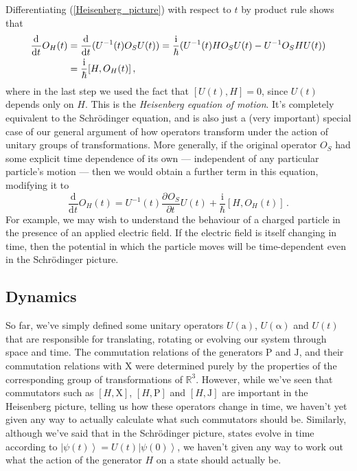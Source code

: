 \documentclass{article}
\theoremstyle{plain}\theoremheaderfont{\normalfont\itshape}\theorembodyfont{\rmfamily}\theoremseparator{.}\newtheorem*{rem}{Remark}\newtheorem*{ex}{Example}\newtheorem*{proof}{Proof}\newtheorem*{altp}{Alternative proof}
\theoremstyle{plain}\theoremheaderfont{\normalfont\bfseries}\theorembodyfont{\rmfamily}\theoremseparator{.}\newtheorem{thm}{Theorem}[section]\newtheorem{lem}[thm]{Lemma}\newtheorem{prop}[thm]{Proposition}\newtheorem*{cor}{Corollary}\newtheorem{defn}[thm]{Definition}\newtheorem{clm}[thm]{Claim}\newtheorem{clminproof}{Claim}
\theoremstyle{break}\theoremheaderfont{\normalfont\itshape}\theorembodyfont{\rmfamily}\theoremseparator{.\medskip}\newtheorem*{proofskip}{Proof}\newtheorem*{exs}{Examples}\newtheorem*{rems}{Remarks}
\theoremstyle{break}\theoremheaderfont{\normalfont\bfseries}\theorembodyfont{\rmfamily}\theoremseparator{.\medskip}\newtheorem{lemskip}[thm]{Lemma}\newtheorem{defnskip}[thm]{Definition}\newtheorem{propskip}[thm]{Proposition}\newtheorem{thmskip}[thm]{Theorem}
\numberwithin{equation}{section}
\newcommand{\ii}{\mathrm{i}}
\newcommand{\dv}[3][]{\frac{\mathrm{d}^{#1} #2}{{\mathrm{d} #3}^{#1}}}
\newcommand{\pdv}[3][]{\frac{\partial^{#1} #2}{{\partial #3}^{#1}}}
\newcommand{\ket}[1]{\left| #1 \right\rangle}
\newcommand{\vb}[1]{\bm{\mathrm{#1}}}
\newcommand{\RR}{\mathbb{R}}
\begin{document}
    Differentiating (\ref{Heisenberg_picture}) with respect to \(t\) by product rule shows that
    \begin{align}
        \dv{}{t} O_H(t)&=\dv{}{t}(U^{-1}(t)O_S U(t))=\frac{\ii}{\hbar}(U^{-1}(t)HO_SU(t)-U^{-1}O_SHU(t))\notag\\
        &=\frac{\ii}{\hbar}[H,O_H(t)]\,,\label{Heisenberg_equation_of_motion}
    \end{align}
    where in the last step we used the fact that \([U(t),H]=0\), since \(U(t)\) depends only on \(H\). This is the \textit{Heisenberg equation of motion}. It's completely equivalent to the Schr\"{o}dinger equation, and is also just a (very important) special case of our general argument of how operators transform under the action of unitary groups of transformations. More generally, if the original operator \(O_S\) had some explicit time dependence of its own --- independent of any particular particle's motion --- then we would obtain a further term in this equation, modifying it to
    \begin{equation}
        \dv{}{t}O_H(t)=U^{-1}(t)\pdv{O_S}{t}U(t)+\frac{\ii}{\hbar}[H,O_H(t)]\,.
    \end{equation}
    For example, we may wish to understand the behaviour of a charged particle in the presence of an applied electric field. If the electric field is itself changing in time, then the potential in which the particle moves will be time-dependent even in the Schr\"{o}dinger picture.

    \subsection{Dynamics}
    So far, we've simply defined some unitary operators \(U(\vb{a})\), \(U(\vb{\alpha})\) and \(U(t)\) that are responsible for translating, rotating or evolving our system through space and time. The commutation relations of the generators \(\vb{P}\) and \(\vb{J}\), and their commutation relations with \(\vb{X}\) were determined purely by the properties of the corresponding group of transformations of \(\RR^3\). However, while we've seen that commutators such as \([H,\vb{X}]\), \([H,\vb{P}]\) and \([H,\vb{J}]\) are important in the Heisenberg picture, telling us how these operators change in time, we haven't yet given any way to actually calculate what such commutators should be. Similarly, although we've said that in the Schr\"{o}dinger picture, states evolve in time according to \(\ket{\psi(t)}=U(t)\ket{\psi(0)}\), we haven't given any way to work out what the action of the generator \(H\) on a state should actually be.
\end{document}
